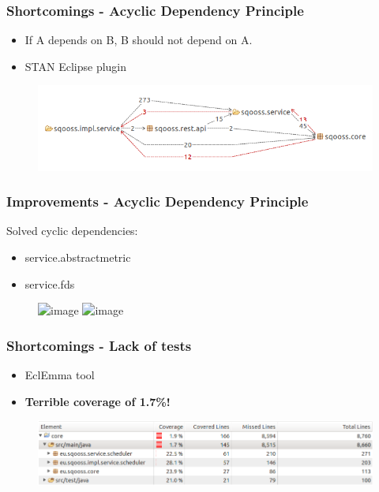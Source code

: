 \documentclass{beamer}
\begin{document}
\begin{frame}
    \frametitle{Shortcomings - Acyclic Dependency Principle}
    \begin{itemize}
        \item If A depends on B, B should not depend on A.
        \item STAN Eclipse plugin
    \end{itemize}
    
    \begin{figure}
    	\centering
    	\includegraphics[width=\textwidth]{../img/cycle1.png}
    \end{figure}
\end{frame}

\begin{frame}
    \frametitle{Improvements - Acyclic Dependency Principle}
    Solved cyclic dependencies:
    \begin{itemize}
        \item service.abstractmetric
        \item service.fds
    \end{itemize}
    
    \begin{figure}
    	\centering
        \includegraphics<1>[width=0.8\textwidth]{../img/fds-before.png}
    	\includegraphics<2>[width=\textwidth]{../img/fds-after.png}
    \end{figure}
\end{frame}

\begin{frame}
    \frametitle{Shortcomings - Lack of tests}
    \begin{itemize}
        \item EclEmma tool
        \item \textbf{Terrible coverage of 1.7\%!}
        
    \end{itemize}
    \begin{figure}
    	\centering
    		\includegraphics[width=\textwidth]{../img/coreCoverageBefore.png}
    \end{figure}
\end{frame}
\end{document}
